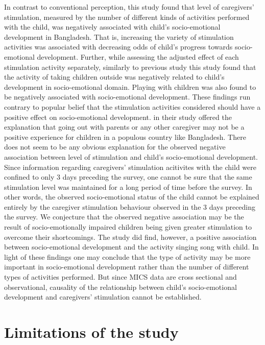 \documentclass[
  12pt,
  oneside]{report}
\begin{document}
In contrast to conventional perception, this study found that level of caregivers' stimulation, measured by the number of different kinds of activities performed with the child, was negatively associated with child's socio-emotional development in Bangladesh. That is, increasing the variety of stimulation activities was associated with decreasing odds of child's progress towards socio-emotional development. Further, while assessing the adjusted effect of each stimulation activity separately, similarly to previous study \citep{alam2021early} this study found that the activity of taking children outside was negatively related to child's development in socio-emotional domain. Playing with children was also found to be negatively associated with socio-emotional development. These findings run contrary to popular belief that the stimulation activities considered should have a positive effect on socio-emotional development. \citep{alam2021early} in their study offered the explanation that going out with parents or any other caregiver may not be a positive experience for children in a populous country like Bangladesh. There does not seem to be any obvious explanation for the observed negative association between level of stimulation and child's socio-emotional development. Since information regarding caregivers' stimulation acitivites with the child were confined to only 3 days preceding the survey, one cannot be sure that the same stimulation level was maintained for a long period of time before the survey. In other words, the observed socio-emotional status of the child cannot be explained entirely by the caregiver stimulation behaviour observed in the 3 days preceding the survey. We conjecture that the observed negative association may be the result of socio-emotionally impaired children being given greater stimulation to overcome their shortcomings. The study did find, however, a positive association between socio-emotional development and the activity singing song with child. In light of these findings one may conclude that the type of activity may be more important in socio-emotional development rather than the number of different types of activities performed. But since MICS data are cross sectional and observational, causality of the relationship between child's socio-emotional development and caregivers' stimulation cannot be established.

\hypertarget{limitations-of-the-study}{%
\section{Limitations of the study}\label{limitations-of-the-study}}
\end{document}
